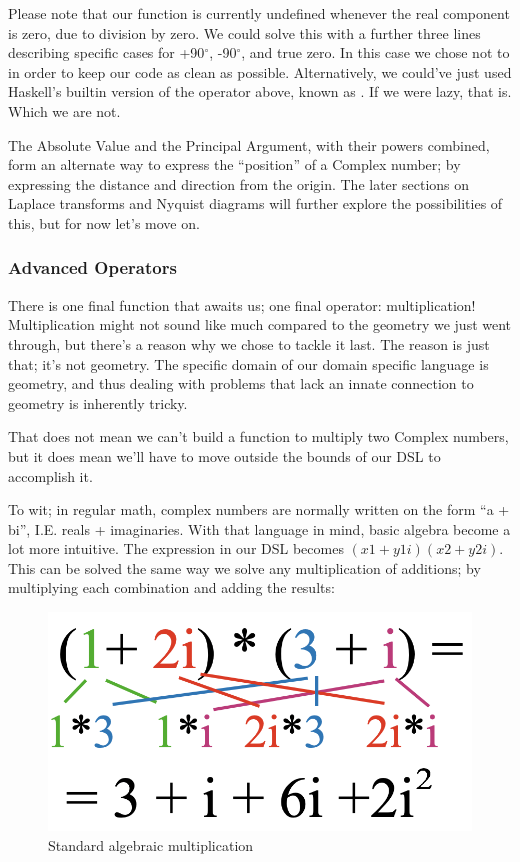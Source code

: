 Please note that our function is currently undefined whenever the real component is zero, due to division by zero. We could solve this with a further three lines describing specific cases for +90$^{\circ}$, -90$^{\circ}$, and true zero. In this case we chose not to in order to keep our code as clean as possible. Alternatively, we could've just used Haskell's builtin version of the operator above, known as . If we were lazy, that is. Which we are not.

The Absolute Value and the Principal Argument, with their powers combined, form an alternate way to express the ``position'' of a Complex number; by expressing the distance and direction from the origin. The later sections on Laplace transforms and Nyquist diagrams will further explore the possibilities of this, but for now let's move on.

\subsubsection{Advanced Operators}

There is one final function that awaits us; one final operator: multiplication!
Multiplication might not sound like much compared to the geometry we just went through, but there's a reason why we chose to tackle it last. The reason is just that; it's not geometry. The specific domain of our domain specific language is geometry, and thus dealing with problems that lack an innate connection to geometry is inherently tricky.

That does not mean we can't build a function to multiply two Complex numbers, but it does mean we'll have to move outside the bounds of our DSL to accomplish it.

To wit; in regular math, complex numbers are normally written on the form ``a + bi'', I.E. reals + imaginaries. With that language in mind, basic algebra become a lot more intuitive. The expression    in our DSL becomes $(x1 + y1i)(x2 + y2i)$. This can be solved the same way we solve any multiplication of additions; by multiplying each combination and adding the results:

\begin{figure}[h!]
    \centering
    \includegraphics[scale= 0.3]{mult.png}
    \caption{Standard algebraic multiplication}
    \label{mult}
\end{figure}

